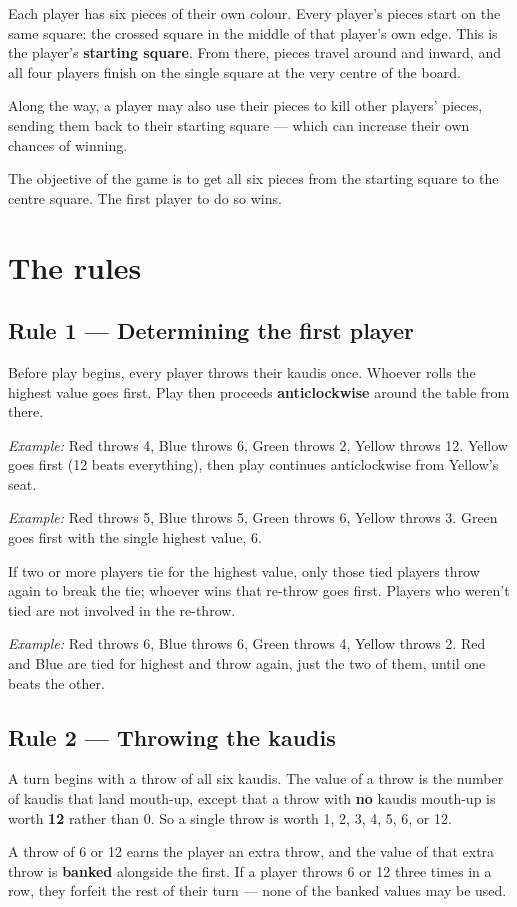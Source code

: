 \documentclass[10pt,a4paper]{article}
\newcommand{\ruletitle}[2]{\subsection*{Rule #1 --- #2}}
\begin{document}
Each player has six pieces of their own colour.
Every player's pieces start on the same square: the crossed square in the
middle of that player's own edge. This is the player's \textbf{starting
square}. From there, pieces travel around and inward, and all four players
finish on the single square at the very centre of the board.

Along the way, a player may also use their pieces to kill other players'
pieces, sending them back to their starting square --- which can increase
their own chances of winning.

The objective of the game is to get all six pieces from the starting square to the centre square. The first player to do so wins.


\section*{The rules}

\ruletitle{1}{Determining the first player}

Before play begins, every player throws their kaudis once. Whoever rolls the
highest value goes first. Play then proceeds \textbf{anticlockwise} around
the table from there.

\emph{Example:} Red throws 4, Blue throws 6, Green throws 2, Yellow throws
12. Yellow goes first (12 beats everything), then play continues
anticlockwise from Yellow's seat.

\emph{Example:} Red throws 5, Blue throws 5, Green throws 6, Yellow throws 3.
Green goes first with the single highest value, 6.

If two or more players tie for the highest value, only those tied players
throw again to break the tie; whoever wins that re-throw goes first. Players
who weren't tied are not involved in the re-throw.

\emph{Example:} Red throws 6, Blue throws 6, Green throws 4, Yellow throws
2. Red and Blue are tied for highest and throw again, just the two of them,
until one beats the other.

\newpage
\ruletitle{2}{Throwing the kaudis}

A turn begins with a throw of all six kaudis. The value of a throw is the
number of kaudis that land mouth-up, except that a throw with \textbf{no}
kaudis mouth-up is worth \textbf{12} rather than 0. So a single throw is
worth 1, 2, 3, 4, 5, 6, or 12.

A throw of 6 or 12 earns the player an extra throw, and the value of that
extra throw is \textbf{banked} alongside the first. If a player throws 6 or
12 three times in a row, they forfeit the rest of their turn --- none of the
banked values may be used.
\end{document}
